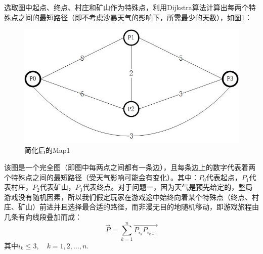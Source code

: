 \documentclass[withoutpre]{cumcmthesis} %
\begin{document}
选取图中起点、终点、村庄和矿山作为特殊点，利用Dijkstra算法计算出每两个特殊点之间的最短路径（即不考虑沙暴天气的影响下，所需最少的天数），如图\ref{fig:map1}：
\begin{figure}[H]
	\centering
	\includegraphics[scale=0.6]{figures/map1.jpg}
	\caption{简化后的Map1}
	\label{fig:map1}
\end{figure}
该图是一个完全图（即图中每两点之间都有一条边），且每条边上的数字代表着两个特殊点之间的最短路径（受天气影响可能会有变化）。其中：$P_0$代表起点，$P_1$代表村庄，$P_2$代表矿山，$P_3$代表终点。对于问题一，因为天气是预先给定的，整局游戏没有随机因素，所以我们假定玩家在游戏途中始终向着某个特殊点（终点、村庄、矿山）前进并且选择最合适的路径，而非漫无目的地随机移动，即游戏旅程由几条有向线段叠加而成：
\begin{equation}
	\overrightarrow{P}=\sum_{k=1}^{n}\overrightarrow{P_{i_k}P_{i_{k+1}}}
\end{equation}
其中$i_k\leqslant3,\quad k=1,2,\dots,n$.

\begin{thebibliography}{9}%

    

\end{thebibliography}
\end{document}
